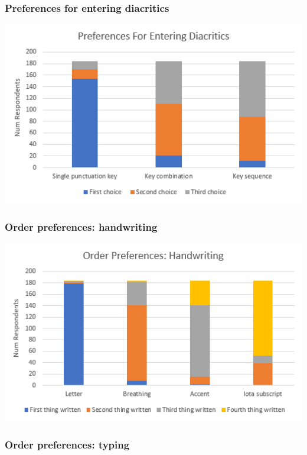 \documentclass[11pt]{article}
\begin{document}
\subsubsection{Preferences for entering diacritics}
\label{sec:org3fd9ebb}

\begin{center}
\includegraphics[width=.9\linewidth]{./images/diacritic-entry-preferences.PNG}
\end{center}

\subsubsection{Order preferences: handwriting}
\label{sec:org44375ed}

\begin{center}
\includegraphics[width=.9\linewidth]{./images/diacritic-entry-order-writing.PNG}
\end{center}

\subsubsection{Order preferences: typing}
\label{sec:orgc2faa46}
\end{document}
